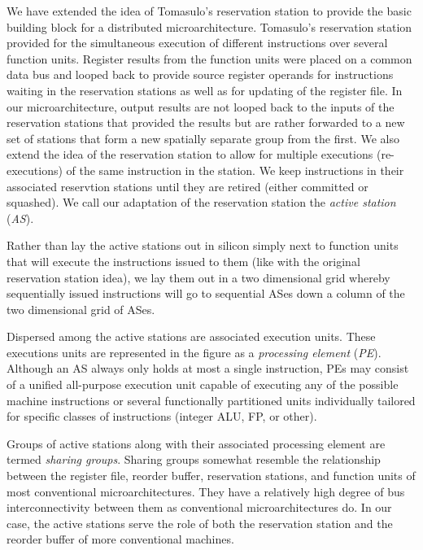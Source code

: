 \documentclass[10pt,dvips]{article}
\begin{document}
We have extended the idea of Tomasulo's reservation
station \cite{Tom67} to provide the basic building block for a distributed
microarchitecture.  Tomasulo's reservation station provided for the
simultaneous execution of different instructions over several
function units.  
Register results from the function units were placed on
a common data bus and looped back to provide source register operands 
for instructions waiting in the reservation stations as well as
for updating of the register file.  In our microarchitecture,
output results are not looped back to the inputs of the reservation
stations
that provided the results but are rather forwarded to a new set of
stations that form a new spatially separate group from the first.  
We
also extend the idea of the reservation station to allow for multiple
executions (re-executions) of the same instruction in the station.  We
keep instructions in their associated reservtion stations until they are
retired (either committed or squashed).  We call our adaptation of the
reservation station the \textit{active station} (\textit{AS}).

Rather than lay the active stations out in silicon simply next to
function units that will execute the instructions issued to them
(like with the original reservation station idea),
we lay them out in a two dimensional grid whereby sequentially
issued instructions will go to sequential ASes down a column of
the two dimensional grid of ASes. 

Dispersed among the active stations are associated execution
units.  These executions units are represented in the figure as
a \textit{processing element} (\textit{PE}).  
Although an AS always only holds at most a single instruction,
PEs may consist of a unified all-purpose execution unit capable of
executing any of the possible machine instructions or
several functionally partitioned units individually tailored
for specific classes of instructions (integer ALU, FP, or other).

Groups of active stations along with their associated processing
element
are termed \textit{sharing groups}.  Sharing groups somewhat resemble
the relationship between the register file, reorder buffer,
reservation stations, and function units of most conventional
microarchitectures.  They have a relatively high degree of bus
interconnectivity between them as conventional microarchitectures do.
In our case, the active stations serve the role of both the
reservation station and the reorder buffer of more conventional
machines.
\end{document}
